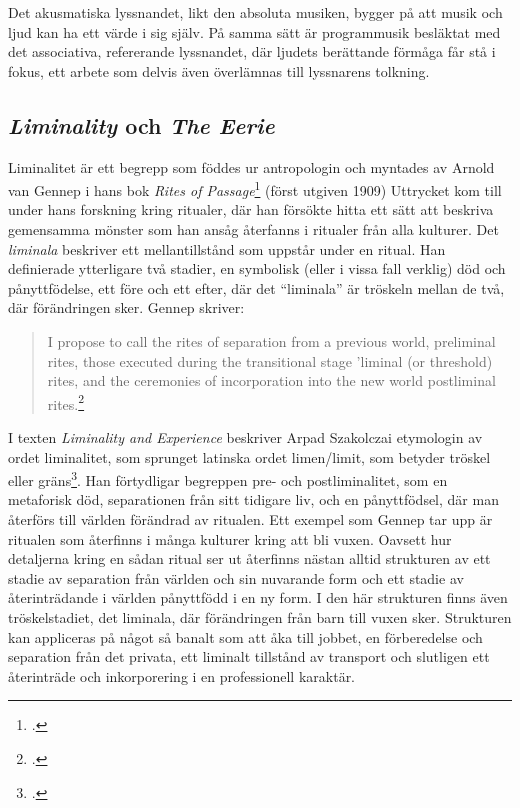 \documentclass{article}
\begin{document}
Det akusmatiska lyssnandet, likt den absoluta musiken, bygger på att musik och ljud kan ha ett värde i sig själv. 
På samma sätt är programmusik besläktat med det associativa, refererande lyssnandet, där ljudets berättande
förmåga får stå i fokus, ett arbete som delvis även överlämnas till lyssnarens tolkning.


\subsection{\emph{Liminality} och \emph{The Eerie}}
Liminalitet är ett begrepp som föddes ur antropologin och myntades av Arnold van Gennep i hans bok \emph{Rites
of Passage}\footcite{Gennep} (först utgiven 1909) Uttrycket kom till under hans forskning kring ritualer, där
han försökte hitta ett sätt att beskriva gemensamma mönster som han ansåg återfanns i ritualer från alla
kulturer. Det \emph{liminala} beskriver ett mellantillstånd som uppstår under en ritual. Han definierade
ytterligare två stadier, en symbolisk (eller i vissa fall verklig) död och pånyttfödelse, ett före och ett
efter, där det ``liminala'' är tröskeln mellan de två, där förändringen sker. Gennep skriver:

\begin{quote}
I propose to call the rites of separation from a previous world, preliminal rites, those executed during the
transitional stage 'liminal (or threshold) rites, and the ceremonies of incorporation into the new world
postliminal rites.\footcite[21]{Gennep}
\end{quote}

I texten \emph{Liminality and Experience} beskriver Arpad Szakolczai etymologin av ordet liminalitet, som
sprunget latinska ordet limen/limit, som betyder tröskel eller gräns\footcite[147-148]{Arpad}. Han förtydligar
begreppen pre- och postliminalitet, som en metaforisk död, separationen från sitt tidigare liv, och en
pånyttfödsel, där man återförs till världen förändrad av ritualen. Ett exempel som Gennep tar upp är ritualen
som återfinns i många kulturer kring att bli vuxen. Oavsett hur detaljerna kring en sådan ritual ser ut
återfinns nästan alltid strukturen av ett stadie av separation från världen och sin nuvarande form och ett
stadie av återinträdande i världen pånyttfödd i en ny form. I den här strukturen finns även tröskelstadiet,
det liminala, där förändringen från barn till vuxen sker. Strukturen kan appliceras på något så banalt som att
åka till jobbet, en förberedelse och separation från det privata, ett liminalt tillstånd av transport och
slutligen ett återinträde och inkorporering i en professionell karaktär.
\end{document}
